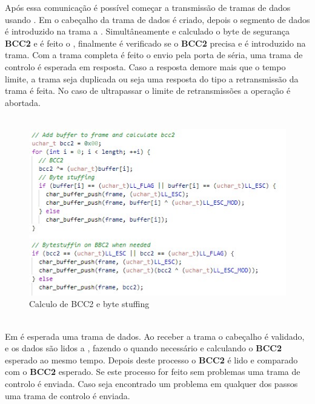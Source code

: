 \documentclass[11pt]{article}
\begin{document}
Após essa comunicação é possível começar a transmissão de tramas de dados usando \textbf{}. Em \textbf{} o cabeçalho da trama de dados é criado, depois o segmento de dados é introduzido na trama  a . Simultâneamente e calculado o byte de segurança \textbf{BCC2} e é feito o \textbf{}, finalmente é verificado se o \textbf{BCC2} precisa \textbf{} e é introduzido na trama. Com a trama completa é feito o envio pela porta de séria, uma trama de controlo  é esperada em resposta. Caso a resposta demore mais que o tempo limite, a trama  seja duplicada ou seja uma
\newpage
\thispagestyle{fancy}
\fancyhf{}
\fancyfoot[R]{\thepage}
\renewcommand*{\footrulewidth}{1pt}
resposta do tipo  a retransmissão da trama é feita. No caso de ultrapassar o limite de retransmissões a operação é abortada.\\~
\begin{figure}[h!]
  \includegraphics[scale=0.8]{BYTESTUFFING.jpg}
  \caption{Calculo de BCC2 e byte stuffing}
\end{figure}
\\
Em \textbf{} é esperada uma trama de dados. Ao receber a trama o cabeçalho é validado, e os dados são lidos  a , fazendo o \textbf{} quando necessário e calculando o \textbf{BCC2} esperado ao mesmo tempo. Depois deste processo o \textbf{BCC2} é lido e comparado com o \textbf{BCC2} esperado. Se este processo for feito sem problemas uma trama de controlo  é enviada. Caso seja encontrado um problema em qualquer dos passos uma trama de controlo  é enviada.\\
\end{document}
